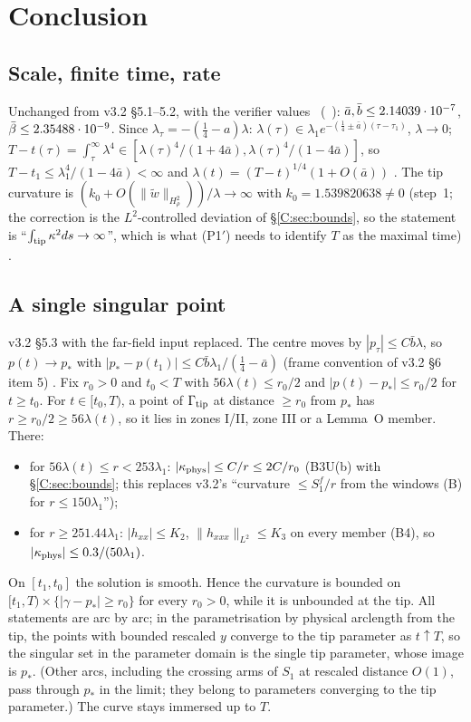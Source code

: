 \documentclass[11pt]{article}
\begin{document}
\section{Conclusion}\label{C:sec:concl}
\subsection{Scale, finite time, rate}
Unchanged from v3.2 \S5.1--5.2, with the  verifier values \tC\ (\SV\ ): $\bar a,\bar b\le2.14039\cdot10^{-7}$, $\bar\beta\le2.35488\cdot10^{-9}$. Since $\lambda_\tau=-(\frac14-a)\lambda$: $\lambda(\tau)\in\lambda_1e^{-(\frac14\pm\bar a)(\tau-\tau_1)}$, $\lambda\to0$; $T-t(\tau)=\int_\tau^\infty\lambda^4\in[\lambda(\tau)^4/(1+4\bar a),\lambda(\tau)^4/(1-4\bar a)]$, so $T-t_1\le\lambda_1^4/(1-4\bar a)<\infty$ and $\lambda(t)=(T-t)^{1/4}(1+O(\bar a))$ \tP. The tip curvature is $(k_0+O(\|\tilde w\|_{H^2_\rho}))/\lambda\to\infty$ with $k_0=1.539820638\ne0$ (step~1; the correction is the $L^2$-controlled deviation of \S\ref{C:sec:bounds}, so the statement is ``$\int_{\rm tip}\kappa^2ds\to\infty$'', which is what (P1$'$) needs to identify $T$ as the maximal time) \tP.

\subsection{A single singular point}\label{C:sec:point}
v3.2 \S5.3 with the far-field input replaced. The centre moves by $|p_\tau|\le C\bar b\lambda$, so $p(t)\to p_*$ with $|p_*-p(t_1)|\le C\bar b\lambda_1/(\frac14-\bar a)$ (frame convention of v3.2 \S6 item 5) \tP. Fix $r_0>0$ and $t_0<T$ with $56\lambda(t)\le r_0/2$ and $|p(t)-p_*|\le r_0/2$ for $t\ge t_0$. For $t\in[t_0,T)$, a point of $\Gamma_{\rm tip}$ at distance $\ge r_0$ from $p_*$ has $r\ge r_0/2\ge56\lambda(t)$, so it lies in zones I/II, zone III or a Lemma~O member. There:
\begin{itemize}[leftmargin=*]
\item for $56\lambda(t)\le r<253\lambda_1$: $|\kappa_{\rm phys}|\le C/r\le2C/r_0$ (B3U(b) with \S\ref{C:sec:bounds}; this replaces v3.2's ``curvature $\le S_1^f/r$ from the windows (B) for $r\le150\lambda_1$'');
\item for $r\ge251.44\lambda_1$: $|h_{xx}|\le K_2$, $\|h_{xxx}\|_{L^2}\le K_3$ on every member (B4), so $|\kappa_{\rm phys}|\le0.3/(50\lambda_1)$.
\end{itemize}
On $[t_1,t_0]$ the solution is smooth. Hence the curvature is bounded on $[t_1,T)\times\{|\gamma-p_*|\ge r_0\}$ for every $r_0>0$, while it is unbounded at the tip. All statements are arc by arc; in the parametrisation by physical arclength from the tip, the points with bounded rescaled $y$ converge to the tip parameter as $t\uparrow T$, so the singular set in the parameter domain is the single tip parameter, whose image is $p_*$. (Other arcs, including the crossing arms of $S_1$ at rescaled distance $O(1)$, pass through $p_*$ in the limit; they belong to parameters converging to the tip parameter.) The curve stays immersed up to $T$.
\end{document}
